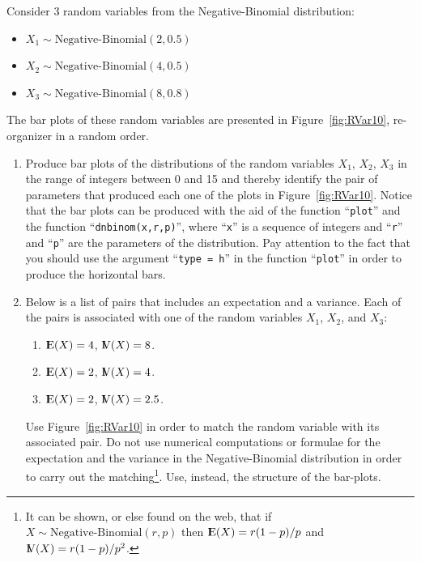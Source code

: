 \documentclass[]{krantz}
\newcommand{\Expec}{{\rm I\kern-.3em E}}
\newcommand{\Var}{{\rm I\kern-.3em V}}
\theoremstyle{definition}
\theoremstyle{definition}
\theoremstyle{definition}
\theoremstyle{remark}
\begin{document}
Consider 3 random variables from the Negative-Binomial distribution:

\begin{itemize}
\item
  \(X_1 \sim \mbox{Negative-Binomial}(2,0.5)\)
\item
  \(X_2 \sim \mbox{Negative-Binomial}(4,0.5)\)
\item
  \(X_3 \sim \mbox{Negative-Binomial}(8,0.8)\)
\end{itemize}

The bar plots of these random variables are presented in
Figure~\ref{fig:RVar10}, re-organizer in a random order.

\begin{enumerate}
\def\labelenumi{\arabic{enumi}.}
\item
  Produce bar plots of the distributions of the random variables
  \(X_1\), \(X_2\), \(X_3\) in the range of integers between 0 and 15
  and thereby identify the pair of parameters that produced each one of
  the plots in Figure~\ref{fig:RVar10}. Notice that the bar plots can be
  produced with the aid of the function ``\texttt{plot}'' and the
  function ``\texttt{dnbinom(x,r,p)}'', where ``\texttt{x}'' is a
  sequence of integers and ``\texttt{r}'' and ``\texttt{p}'' are the
  parameters of the distribution. Pay attention to the fact that you
  should use the argument ``\texttt{type\ =\ h}'' in the function
  ``\texttt{plot}'' in order to produce the horizontal bars.
\item
  Below is a list of pairs that includes an expectation and a variance.
  Each of the pairs is associated with one of the random variables
  \(X_1\), \(X_2\), and \(X_3\):

  \begin{enumerate}
  \def\labelenumii{\arabic{enumii}.}
  \item
    \(\Expec(X) = 4\), \(\Var(X) = 8\).
  \item
    \(\Expec(X) = 2\), \(\Var(X) = 4\).
  \item
    \(\Expec(X) = 2\), \(\Var(X) = 2.5\).
  \end{enumerate}

  Use Figure~\ref{fig:RVar10} in order to match the random variable with
  its associated pair. Do not use numerical computations or formulae for
  the expectation and the variance in the Negative-Binomial distribution
  in order to carry out the matching\footnote{It can be shown, or else
    found on the web, that if \(X\sim \mbox{Negative-Binomial}(r,p)\)
    then \(\Expec(X) = r(1-p)/p\) and \(\Var(X) = r(1-p)/p^2\).}. Use,
  instead, the structure of the bar-plots.
\end{enumerate}
\end{document}
